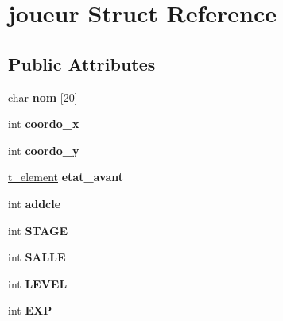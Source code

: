 \hypertarget{structjoueur}{}\section{joueur Struct Reference}
\label{structjoueur}
\subsection*{Public Attributes}
\begin{DoxyCompactItemize}
\item 
char {\bfseries nom} \mbox{[}20\mbox{]}\hypertarget{structjoueur_a3f79e73209f68a9919fcbdccf216842a}{}\label{structjoueur_a3f79e73209f68a9919fcbdccf216842a}

\item 
int {\bfseries coordo\+\_\+x}\hypertarget{structjoueur_aea649de5de6134dee7ba64cc28847b54}{}\label{structjoueur_aea649de5de6134dee7ba64cc28847b54}

\item 
int {\bfseries coordo\+\_\+y}\hypertarget{structjoueur_ae31bcfee02e5ddb294dade2742f243ef}{}\label{structjoueur_ae31bcfee02e5ddb294dade2742f243ef}

\item 
\hyperlink{total_8h_a8b071baf43ce73c99f88fc8169b0514d}{t\+\_\+element} {\bfseries etat\+\_\+avant}\hypertarget{structjoueur_a4e6ebd0210197663787aaced59da8dc1}{}\label{structjoueur_a4e6ebd0210197663787aaced59da8dc1}

\item 
int {\bfseries addcle}\hypertarget{structjoueur_a5d36937b669fe30e217aaa073fbe3068}{}\label{structjoueur_a5d36937b669fe30e217aaa073fbe3068}

\item 
int {\bfseries S\+T\+A\+GE}\hypertarget{structjoueur_a59e1bcd7aa89987c6aa3e1655924d048}{}\label{structjoueur_a59e1bcd7aa89987c6aa3e1655924d048}

\item 
int {\bfseries S\+A\+L\+LE}\hypertarget{structjoueur_a7e2a6ac4a76ed5c6c209d0226311ef57}{}\label{structjoueur_a7e2a6ac4a76ed5c6c209d0226311ef57}

\item 
int {\bfseries L\+E\+V\+EL}\hypertarget{structjoueur_a400f59a4e96ca23f112aea05d42c919d}{}\label{structjoueur_a400f59a4e96ca23f112aea05d42c919d}

\item 
int {\bfseries E\+XP}\hypertarget{structjoueur_a175488c306ae6259266b6c5e76547e87}{}\label{structjoueur_a175488c306ae6259266b6c5e76547e87}


\end{DoxyCompactItemize}
